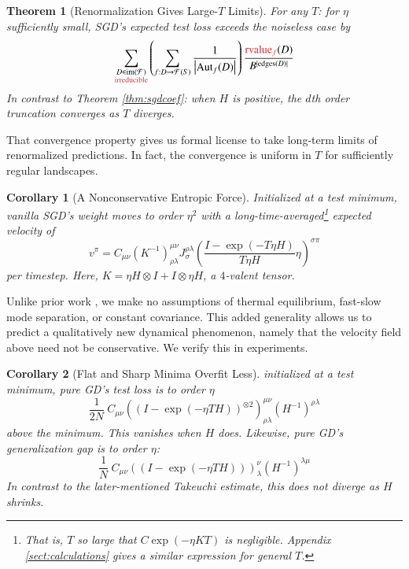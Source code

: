 \documentclass{article}
\theoremstyle{plain}
\newtheorem{thm}{Theorem}
\newtheorem{cor}{Corollary}
\theoremstyle{definition}
\newcommand{\Free}{\mathcal{F}}
\newcommand{\Aut}{\text{\textnormal{Aut}}}
\newcommand{\image}{\text{\textnormal{im}}}
\newcommand{\rvalue}{\text{\textnormal{rvalue}}}
\newcommand{\edges}{\text{\textnormal{edges}}}
\newcommand{\wrap}[1]{\left(#1\right)}
\newcommand{\wabs}[1]{\left|#1\right|}
\begin{document}
        \begin{thm}[Renormalization Gives Large-$T$ Limits] \label{thm:renorm}
            For any $T$: for $\eta$ sufficiently small, SGD's expected test
            loss exceeds the noiseless case by 
            \begin{equation*} \label{eq:renorm}
                \sum_{\substack{D \in \image(\Free)\\ \text{\color{moor} irreducible}}}
                \wrap{
                    \sum_{f: D\to\Free(S)}
                    \frac{1}{\wabs{\Aut_f(D)}}
                }
                \frac{{\color{moor} \rvalue_f}(D)}{B^{|\edges(D)|}}
            \end{equation*}
            In contrast to Theorem \ref{thm:sgdcoef}: when $H$ is positive, the
            $d$th order truncation converges as $T$ diverges.
        \end{thm}
        That convergence property gives us formal license to take long-term
        limits of renormalized predictions.  In fact, the convergence is
        uniform in $T$ for sufficiently regular landscapes.
        \begin{cor}[A Nonconservative Entropic Force]\label{cor:entropic}
            Initialized at a test minimum, vanilla SGD's weight moves to
            order $\eta^2$ with a long-time-averaged\footnote{
                That is, $T$ so large that $C \exp(-\eta K T)$ is negligible.
                Appendix \ref{sect:calculations} gives a similar expression for general $T$.
            }
            expected velocity of
            $$
                v^\pi = C_{\mu \nu}
                \wrap{K^{-1}}^{\mu\nu}_{\rho\lambda}
                J^{\rho\lambda}_{\sigma}
                \wrap{\frac{I - \exp(-T \eta H)}{T \eta H} \eta}^{\sigma \pi}
            $$
            per timestep.
            Here, $K = \eta H \otimes I + I \otimes \eta H$, a
            $4$-valent tensor. 
        \end{cor}
        Unlike prior work \cite{we19b}, we make no assumptions of
        thermal equilibrium, fast-slow mode separation, or constant covariance.
        This added generality allows us to predict a qualitatively new
        dynamical phenomenon, namely that the velocity field above need not be
        conservative.  We verify this in experiments.
        \begin{cor}[Flat and Sharp Minima Overfit Less]\label{cor:overfit}
            initialized at a test minimum, pure GD's test loss is to
            order $\eta$
            $$
                \frac{1}{2N} ~
                    C_{\mu\nu}
                    \wrap{(I - \exp(-\eta T H))^{\otimes 2}}^{\mu\nu}_{\rho\lambda}
                    \wrap{H^{-1}}^{\rho\lambda}
            $$
            above the minimum.  This vanishes when $H$ does. 
            Likewise, pure GD's generalization gap is to order $\eta$:  
            $$
                \frac{1}{N} ~
                    C_{\mu\nu}
                    \wrap{(I - \exp(-\eta T H))}^{\nu}_{\lambda}
                    \wrap{H^{-1}}^{\lambda\mu}
            $$
            In contrast to the later-mentioned Takeuchi estimate, this does not
            diverge as $H$ shrinks.
        \end{cor}
\end{document}
